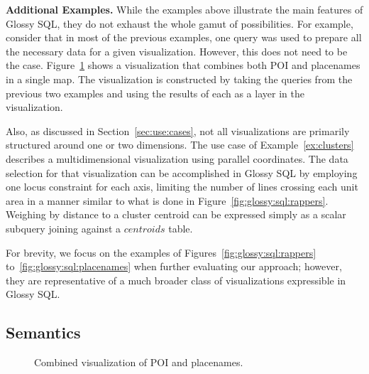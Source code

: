 \documentclass[11pt, oneside]{report}
\newcommand{\minisec}[1]{\noindent\textbf{#1.}}
\begin{document}
{\minisec{Additional Examples}
While the examples above illustrate the main features of Glossy SQL, they do not exhaust the whole gamut of possibilities. For example, consider that in most of the previous examples, one query was used to prepare all the necessary data for a given visualization. However, this does not need to be the case. Figure~\ref{fig:tourism:viz} shows a visualization that combines both POI and placenames in a single map. The visualization is constructed by taking the queries from the previous two examples and using the results of each as a layer in the visualization. 

Also, as discussed in Section~\ref{sec:use:cases}, not all visualizations are primarily structured around one or two dimensions. The use case of Example~\ref{ex:clusters} describes a multidimensional visualization using parallel coordinates. The data selection for that visualization can be accomplished in Glossy SQL by employing one locus constraint for each axis, limiting the number of lines crossing each unit area in a manner similar to what is done in Figure~\ref{fig:glossy:sql:rappers}. Weighing by distance to a cluster centroid can be expressed simply as a scalar subquery joining against a $centroids$ table. 

For brevity, we focus on the examples of Figures~\ref{fig:glossy:sql:rappers} to~\ref{fig:glossy:sql:placenames} when further evaluating our approach; however, they are representative of a much broader class of visualizations expressible in Glossy SQL.    

\subsection{Semantics}
\label{sec:semantics}


\begin{figure}[t]
\centering
{}
\caption{Combined visualization of POI and placenames.} 
\label{fig:tourism:viz}
\end{figure}


}
\end{document}
